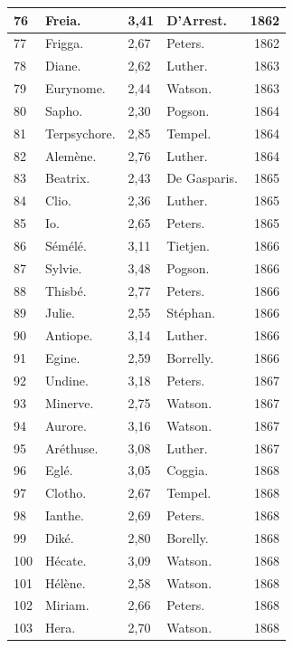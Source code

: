 \documentclass[a4paper, 11pt, oneside, landscape]{article}
\begin{document}
\begin{landscape}
\begin{center}
\begin{longtable}{|p{10mm}|l|p{10mm}|l|r|}
        76 & Freia. & 3,41 & D'Arrest. & 1862 \\ \hline
        77 & Frigga. & 2,67 & Peters. & 1862 \\ \hline
        78 & Diane. & 2,62 & Luther. & 1863 \\ \hline
        79 & Eurynome. & 2,44 & Watson. & 1863 \\ \hline
        80 & Sapho. & 2,30 & Pogson. & 1864 \\ \hline
        81 & Terpsychore. & 2,85 & Tempel. & 1864 \\ \hline
        82 & Alemène. & 2,76 & Luther. & 1864 \\ \hline
        83 & Beatrix. & 2,43 & De Gasparis. & 1865 \\ \hline
        84 & Clio. & 2,36 & Luther. & 1865 \\ \hline
        85 & Io. & 2,65 & Peters. & 1865 \\ \hline
        86 & Sémélé. & 3,11 & Tietjen. & 1866 \\ \hline
        87 & Sylvie. & 3,48 & Pogson. & 1866 \\ \hline
        88 & Thisbé. & 2,77 & Peters. & 1866 \\ \hline
        89 & Julie. & 2,55 & Stéphan. & 1866 \\ \hline
        90 & Antiope. & 3,14 & Luther. & 1866 \\ \hline
        91 & Egine. & 2,59 & Borrelly. & 1866 \\ \hline
        92 & Undine. & 3,18 & Peters. & 1867 \\ \hline
        93 & Minerve. & 2,75 & Watson. & 1867 \\ \hline
        94 & Aurore. & 3,16 & Watson. & 1867 \\ \hline
        95 & Aréthuse. & 3,08 & Luther. & 1867 \\ \hline
        96 & Eglé. & 3,05 & Coggia. & 1868 \\ \hline
        97 & Clotho. & 2,67 & Tempel. & 1868 \\ \hline
        98 & Ianthe. & 2,69 & Peters. & 1868 \\ \hline
        99 & Diké. & 2,80 & Borelly. & 1868 \\ \hline
        100 & Hécate. & 3,09 & Watson. & 1868 \\ \hline
        101 & Hélène. & 2,58 & Watson. & 1868 \\ \hline
        102 & Miriam. & 2,66 & Peters. & 1868 \\ \hline
        103 & Hera. & 2,70 & Watson. & 1868 \\ \hline

\end{longtable}
\end{center}
\end{landscape}
\end{document}
